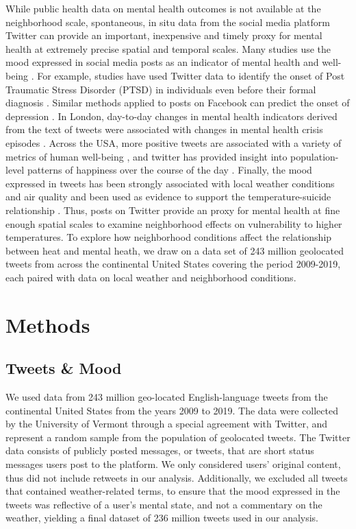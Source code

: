 \documentclass[titlepage]{article}
\begin{document}
While public health data on mental health outcomes is not available at the neighborhood scale, spontaneous, in situ data from the social media platform Twitter can provide an important, inexpensive and timely proxy for mental health at extremely precise spatial and temporal scales. Many studies use the mood expressed in social media posts as an indicator of mental health and well-being \citep{Edo-Osagie2020Jul, Sinnenberg2016Dec}. For example, studies have used Twitter data to identify the onset of Post Traumatic Stress Disorder (PTSD) in individuals even before their formal diagnosis \citep{Reece2017Oct}. Similar methods applied to posts on Facebook can predict the onset of depression \citep{Eichstaedt2018Oct}. In London, day-to-day changes in mental health indicators derived from the text of tweets were associated with changes in mental health crisis episodes \citep{Kolliakou2020Feb}. Across the USA, more positive tweets are associated with a variety of metrics of human well-being \citep{Mitchell2013May}, and twitter has provided insight into population-level patterns of happiness over the course of the day \citep{Dodds2011}. Finally, the mood expressed in tweets has been strongly associated with local weather conditions and air quality \citep{baylis_weather_2018, Zheng2019} and been used as evidence to support the temperature-suicide relationship \citep{Burke2018Aug}. Thus, posts on Twitter provide an proxy for mental health at fine enough spatial scales to examine neighborhood effects on vulnerability to higher temperatures. To explore how neighborhood conditions affect the relationship between heat and mental heath, we draw on a data set of 243 million geolocated tweets from across the continental United States covering the period 2009-2019, each paired with data on local weather and neighborhood conditions.

\section*{Methods}
\subsection*{Tweets \& Mood}
We used data from 243 million geo-located English-language tweets from the continental United States from the years 2009 to 2019. The data were collected by the University of Vermont through a special agreement with Twitter, and represent a random sample from the population of geolocated tweets.  The Twitter data consists of publicly posted messages, or tweets, that are short status messages users post to the platform. We only considered users’ original content, thus did not include retweets in our analysis. Additionally, we excluded all tweets that contained weather-related terms, to ensure that the mood expressed in the tweets was reflective of a user's mental state, and not a commentary on the weather, yielding a final dataset of 236 million tweets used in our analysis.
\end{document}
